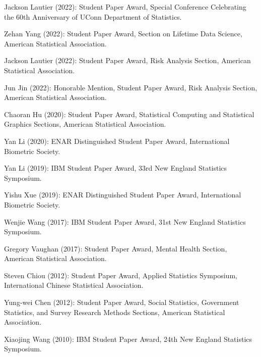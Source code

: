 \documentclass[Statistics]{vita}
\begin{document}
\begin{vita}
\begin{TeachingAccomplishments}
\begin{StudentAwards}
    \item Jackson Lautier (2022): Student Paper Award, Special Conference Celebrating the 60th Anniversary of UConn Department of Statistics.
    \item Zehan Yang (2022): Student Paper Award, Section on Lifetime Data Science, American Statistical Association.
    \item Jackson Lautier (2022): Student Paper Award, Risk Analysis Section, American Statistical Association.
    \item Jun Jin (2022): Honorable Mention, Student Paper Award, Risk Analysis Section, American Statistical Association.
    \item Chaoran Hu (2020): Student Paper Award, Statistical Computing and Statistical Graphics Sections, American Statistical Association.
    \item Yan Li (2020): ENAR Distinguished Student Paper Award, International Biometric Society.
    \item Yan Li (2019): IBM Student Paper Award, 33rd New England Statistics Symposium.
    \item Yishu Xue (2019): ENAR Distinguished Student Paper Award, International Biometric Society.
    \item Wenjie Wang (2017): IBM Student Paper Award, 31st New England Statistics Symposium.
    \item Gregory Vaughan (2017): Student Paper Award, Mental Health Section, American Statistical Association.
    \item Steven Chiou (2012): Student Paper Award, Applied Statistics Symposium, International Chinese Statistical Association.
    \item Yung-wei Chen (2012): Student Paper Award,  Social Statistics, Government Statistics, and Survey Research Methods Sections,  American Statistical Association.
    \item Xiaojing Wang (2010): IBM Student Paper Award, 24th New England Statistics Symposium.
    \end{StudentAwards}

\end{TeachingAccomplishments}
\end{vita}
\end{document}
